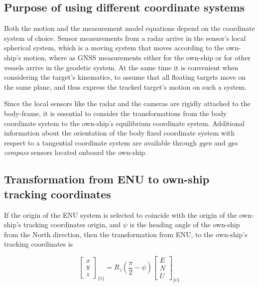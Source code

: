 \subsection{Purpose of using different coordinate systems}

Both the motion and the measurement model equations depend on the coordinate system of choice. Sensor measurements from a radar arrive in the sensor's local spherical system, which is a moving system that moves according to the own-ship's motion, where as GNSS measurements either for the own-ship or for other vessels arrive in the geodetic system. At the same time it is convenient when considering the target's kinematics, to assume that all floating targets move on the same plane, and thus express the tracked target's motion on such a system.

Since the local sensors like the radar and the cameras are rigidly attached to the body-frame, it is essential to consider the transformations from the body coordinate system to the own-ship's equilibrium coordinate system. Additional information about the orientation of the body fixed coordinate system with respect to a tangential coordinate system are available through \textit{gyro} and \textit{gps compass} sensors located onboard the own-ship. 

\subsection{Transformation from ENU to own-ship tracking coordinates}


If the origin of the ENU system is selected to coincide with the origin of the own-ship's tracking coordinates origin, and $\psi$ is the heading angle of the own-ship from the North direction, then the transformation from ENU, to the own-ship's tracking coordinates is





\begin{equation}
\begin{bmatrix}
x \\
y \\
z
\end{bmatrix}_{\text{\{t\}}} = R_{z}(\frac{\pi}{2}-\psi)
\begin{bmatrix}
E \\
N \\
U
\end{bmatrix}_{\text{\{e\}}}
\end{equation}

